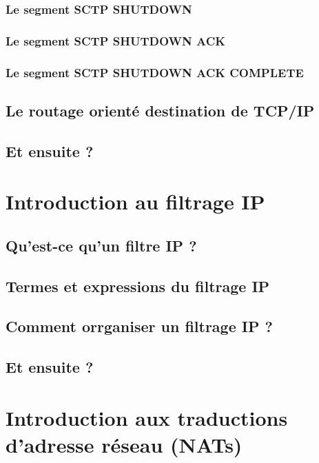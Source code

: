\documentclass[a4paper,11pt]{report}
\begin{document}
\subsection{Le segment SCTP SHUTDOWN}

\subsection{Le segment SCTP SHUTDOWN ACK}

\subsection{Le segment SCTP SHUTDOWN ACK COMPLETE}

%
\section{Le routage orienté destination de TCP/IP}

\section{Et ensuite ?}

\chapter{Introduction au filtrage IP}

\section{Qu'est-ce qu'un filtre IP ?}

\section{Termes et expressions du filtrage IP}

\section{Comment orrganiser un filtrage IP ?}

\section{Et ensuite ?}

\chapter{Introduction aux traductions d'adresse réseau (NATs)}
\end{document}
